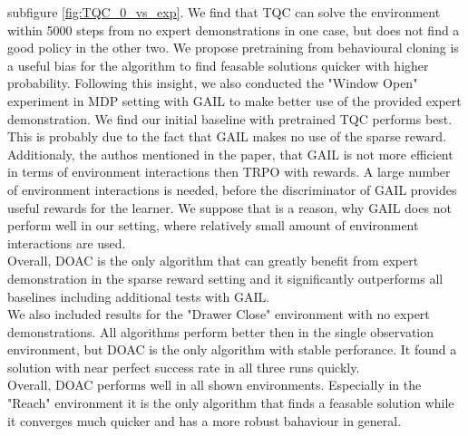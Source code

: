 subfigure \ref{fig:TQC_0_vs_exp}. We find that TQC can solve the environment within 5000 steps from no expert demonstrations in one case, but does not find a good policy in the other two. 
We propose pretraining from behavioural cloning is a useful bias for the algorithm to find feasable solutions quicker with higher probability. Following this insight, 
we also conducted the "Window Open" experiment in MDP setting with GAIL to make better use of the provided expert demonstration. We find our initial 
baseline with pretrained TQC performs best. This is probably due to the fact that GAIL makes no use of the sparse reward. Additionaly, 
the authos mentioned in the paper, that GAIL is not more efficient in terms of environment interactions then TRPO with rewards. A large number of 
environment interactions is needed, before the discriminator of GAIL provides useful rewards for the learner. We suppose that is a reason, why GAIL does not perform 
well in our setting, where relatively small amount of environment interactions are used. \\

Overall, DOAC is the only algorithm that can greatly benefit from expert demonstration in the sparse reward setting and 
it significantly outperforms all baselines including additional tests with GAIL. \\

We also included results for the "Drawer Close" environment with no expert demonstrations. All algorithms perform better then in the single observation environment, 
but DOAC is the only algorithm with stable perforance. It found a solution with near perfect success rate in all three runs quickly. \\
Overall, DOAC performs well in all shown environments. Especially in the "Reach" environment it is the only algorithm that finds a feasable solution while it 
converges much quicker and has a more robust bahaviour in general. 

